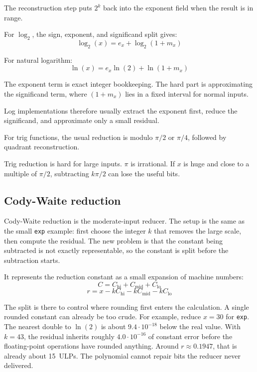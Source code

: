 \documentclass[manuscript, nonacm]{acmart}
\begin{document}
    The reconstruction step puts $2^k$ back into the exponent field when the
    result is in range.

    For $\log_2$, the sign, exponent, and significand split gives:
    \[ \log_2(x) = e_x + \log_2(1 + m_x) \]

    For natural logarithm:
    \[ \ln(x) = e_x \ln(2) + \ln(1 + m_x) \]

    The exponent term is exact integer bookkeeping. The hard part is
    approximating the significand term, where $(1 + m_x)$ lies in a fixed
    interval for normal inputs.

    Log implementations therefore usually extract the exponent first, reduce the
    significand, and approximate only a small residual.

    For trig functions, the usual reduction is modulo $\pi/2$ or $\pi/4$,
    followed by quadrant reconstruction.

    Trig reduction is hard for large inputs.  $\pi$ is irrational. If $x$ is
    huge and close to a multiple of $\pi/2$, subtracting $k\pi/2$ can lose the
    useful bits.

    \subsection{Cody-Waite reduction}

    Cody-Waite reduction is the moderate-input reducer. The setup is the same
    as the small \texttt{exp} example: first choose the integer $k$ that removes
    the large scale, then compute the residual. The new problem is that the
    constant being subtracted is not exactly representable, so the constant is
    split before the subtraction starts.

    It represents the reduction constant as a small expansion of machine numbers:
    \[ C = C_\mathrm{hi} + C_\mathrm{mid} + C_\mathrm{lo} \]
    \[ r = x - kC_\mathrm{hi} - kC_\mathrm{mid} - kC_\mathrm{lo} \]

    The split is there to control where rounding first enters the calculation.
    A single rounded constant can already be too crude. For example, reduce
    $x = 30$ for \texttt{exp}. The nearest double to $\ln(2)$ is about
    $9.4 \cdot 10^{-18}$ below the real value. With $k = 43$, the residual
    inherits roughly $4.0 \cdot 10^{-16}$ of constant error before the
    floating-point operations have rounded anything. Around
    $r \approx 0.1947$, that is already about 15~ULPs. The polynomial cannot
    repair bits the reducer never delivered.
\end{document}
